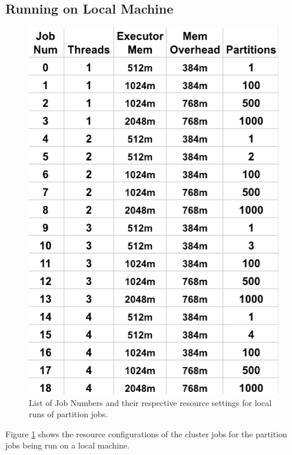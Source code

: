 \documentclass[conference]{IEEEtran}
\begin{document}
\subsection{Running on Local Machine}
\begin{figure}
    \includegraphics[width=\linewidth]{images/partition_local_job.png}
    \caption{List of Job Numbers and their respective resource settings for local runs of partition jobs.}
    \label{fig:partition_local_job}
\end{figure}

Figure \ref{fig:partition_local_job} shows the resource configurations of the cluster jobs for the partition jobs being run on a local machine.
\end{document}
